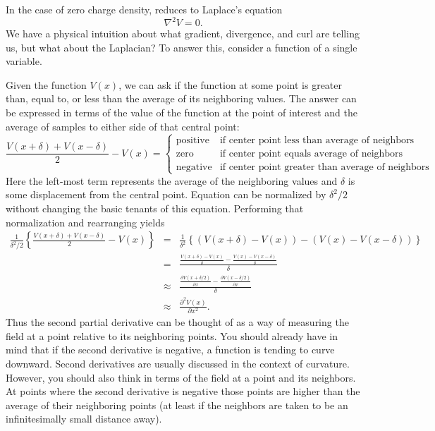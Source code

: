In the case of zero charge density,  reduces to
Laplace's equation
\begin{equation}
  \nabla^2 V = 0.
\end{equation}  
We have a physical intuition about what gradient, divergence, and curl
are telling us, but what about the Laplacian?  To answer this,
consider a function of a single variable.

Given the function $V(x)$, we can ask if the function at some point is
greater than, equal to, or less than the average of its neighboring
values.  The answer can be expressed in terms of the value of the
function at the point of interest and the average of samples to either
side of that central point:
\begin{equation}
  \frac{V(x+\delta) + V(x-\delta)}{2} - V(x) =
  \left\{
    \begin{array}{ll}
      \mbox{positive}&\mbox{if center point less than average of neighbors} \\
      \mbox{zero} &\mbox{if center point equals average of neighbors} \\
      \mbox{negative}&\mbox{if center point greater than average of neighbors}
    \end{array}
  \right.
  \label{eq:avg}
\end{equation}
Here the left-most term represents the average of the neighboring
values and $\delta$ is some displacement from the central point.
Equation  can be normalized by $\delta^2/2$ without changing
the basic tenants of this equation.  Performing that normalization and
rearranging yields
\begin{eqnarray}  
  \frac{1}{\delta^2/2}
  \left\{
    \frac{V(x+\delta) + V(x-\delta)}{2} - V(x)
  \right\}
  &=&
  \frac{1}{\delta^2}
  \left\{
    (V(x+\delta) - V(x)) - (V(x)-V(x-\delta))
  \right\} \nonumber
 \\
  &=&
  \frac{
    \frac{V(x+\delta) - V(x)}{\delta} -
    \frac{V(x)-V(x-\delta)}{\delta}}{\delta}  \nonumber
 \\
  &\approx&
  \frac{
    \frac{\partial V(x+\delta/2)}{\partial x} -
    \frac{\partial V(x-\delta/2)}{\partial x}}{\delta} \nonumber
 \\
  &\approx&
  \frac{\partial^2 V(x)}{\partial x^2}.
\end{eqnarray}
Thus the second partial derivative can be thought of as a way of
measuring the field at a point relative to its neighboring points.
You should already have in mind that if the second derivative is
negative, a function is tending to curve downward.  Second derivatives
are usually discussed in the context of curvature.  However, you
should also think in terms of the field at a point and its neighbors.
At points where the second derivative is negative those points are
higher than the average of their neighboring points (at least if the
neighbors are taken to be an infinitesimally small distance away).

